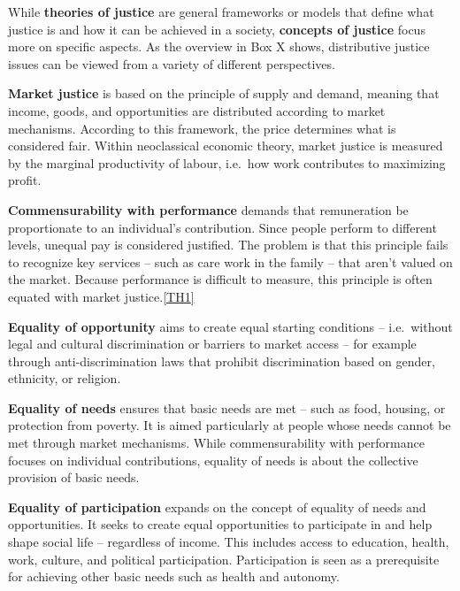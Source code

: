 \documentclass[
  a4paper,
  openany]{book}
\newcounter{quartocallouttipno}
\newcommand{\quartocallouttip}[1]{\refstepcounter{quartocallouttipno}\label{#1}}
\begin{document}
While \textbf{theories of justice} are general frameworks or models that
define what justice is and how it can be achieved in a society,
\textbf{concepts of justice} focus more on specific aspects. As the
overview in Box X shows, distributive justice issues can be viewed from
a variety of different perspectives.

\begin{tcolorbox}[enhanced jigsaw, left=2mm, arc=.35mm, titlerule=0mm, opacityback=0, leftrule=.75mm, title={Note \ref*{tip-concepts}: Normative concepts of justice based on (Novy et al.~2023)}, breakable, bottomtitle=1mm, rightrule=.15mm, coltitle=black, toptitle=1mm, bottomrule=.15mm, colback=white, opacitybacktitle=0.6, colbacktitle=quarto-callout-note-color!10!white, toprule=.15mm, colframe=quarto-callout-note-color-frame]

\quartocallouttip{tip-concepts} 

\textbf{Market justice} is based on the principle of supply and demand,
meaning that income, goods, and opportunities are distributed according
to market mechanisms. According to this framework, the price determines
what is considered fair. Within neoclassical economic theory, market
justice is measured by the marginal productivity of labour, i.e.~how
work contributes to maximizing profit.

\textbf{Commensurability with performance} demands that remuneration be
proportionate to an individual's contribution. Since people perform to
different levels, unequal pay is considered justified. The problem is
that this principle fails to recognize key services -- such as care work
in the family -- that aren't valued on the market. Because performance
is difficult to measure, this principle is often equated with market
justice.\hyperref[_msocom_1]{{[}TH1{]}}~

\textbf{Equality of opportunity} aims to create equal starting
conditions -- i.e.~without legal and cultural discrimination or barriers
to market access -- for example through anti-discrimination laws that
prohibit discrimination based on gender, ethnicity, or religion.

\textbf{Equality of needs} ensures that basic needs are met -- such as
food, housing, or protection from poverty. It is aimed particularly at
people whose needs cannot be met through market mechanisms. While
commensurability with performance focuses on individual contributions,
equality of needs is about the collective provision of basic needs.

\textbf{Equality of participation} expands on the concept of equality of
needs and opportunities. It seeks to create equal opportunities to
participate in and help shape social life -- regardless of income. This
includes access to education, health, work, culture, and political
participation. Participation is seen as a prerequisite for achieving
other basic needs such as health and autonomy.


\end{tcolorbox}
\end{document}
